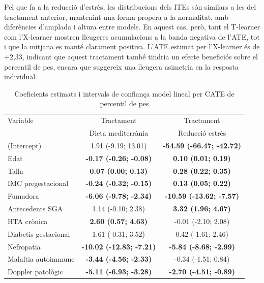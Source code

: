 \documentclass[../main.tex]{subfiles}
\begin{document}
    Pel que fa a la reducció d'estrès, les distribucions dels ITEs són similars a les del tractament anterior, mantenint una forma propera a la normalitat, amb diferències d’amplada i altura entre models. En aquest cas, però, tant el T-learner com l’X-learner mostren lleugeres acumulacions a la banda negativa de l’ATE, tot i que la mitjana es manté clarament positiva. L’ATE estimat per l’X-learner és de +2,33, indicant que aquest tractament també tindria un efecte beneficiós sobre el percentil de pes, encara que suggereix una lleugera asimetria en la resposta individual.


    \begin{table}[H]
        \centering
        \captionsetup{font=small}
        \caption{Coeficients estimats i intervals de confiança model lineal per CATE de percentil de pes}
        \centering
        \scriptsize
        \label{tab:coef_percentil}
        \begin{tabular}[t]{p{4cm} c @{\hspace{1cm}} c}
        \toprule
        Variable & Tractament  & Tractament \\
         & Dieta mediterrània & Reducció estrès \\
        \midrule
        (Intercept) & 1.91 (-9.19; 13.01) & \textbf{-54.59 (-66.47; -42.72)}\\
        Edat & \textbf{-0.17 (-0.26; -0.08)} & \textbf{0.10 (0.01; 0.19)}\\
        Talla & \textbf{0.07 (0.00; 0.13)} & \textbf{0.28 (0.22; 0.35)}\\
        IMC pregestacional & \textbf{-0.24 (-0.32; -0.15)} & \textbf{0.13 (0.05; 0.22)}\\
        Fumadora & \textbf{-6.06 (-9.78; -2.34)} & \textbf{-10.59 (-13.62; -7.57)}\\
        \addlinespace
        Antecedents SGA & 1.14 (-0.10; 2.38) & \textbf{3.32 (1.96; 4.67)}\\
        HTA crònica & \textbf{2.60 (0.57; 4.63)} & -0.01 (-2.10; 2.08)\\
        Diabetis gestacional & 1.61 (-0.31; 3.52) & 0.42 (-1.61; 2.46)\\
        Nefropatia & \textbf{-10.02 (-12.83; -7.21)} & \textbf{-5.84 (-8.68; -2.99)}\\
        Malaltia autoimmune & \textbf{-3.44 (-4.56; -2.33)} & -0.34 (-1.51; 0.84)\\
        \addlinespace
        Doppler patològic & \textbf{-5.11 (-6.93; -3.28)} & \textbf{-2.70 (-4.51; -0.89)}\\

\end{tabular}
\end{table}
\end{document}
